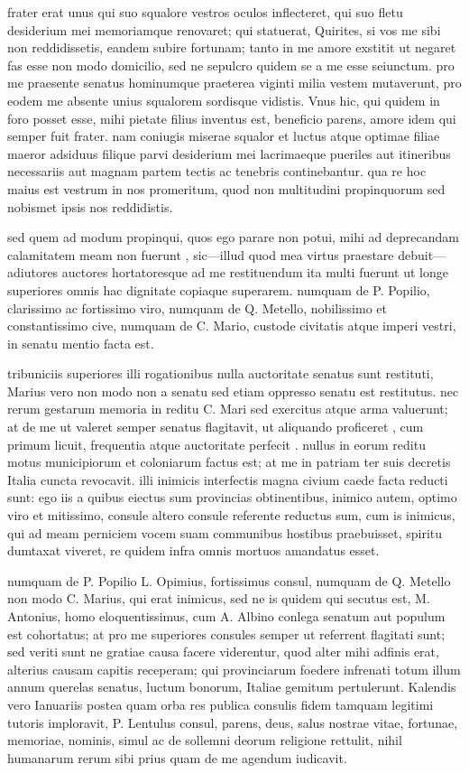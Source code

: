  frater erat unus qui suo squalore vestros oculos inflecteret, qui suo fletu desiderium mei memoriamque renovaret; qui statuerat, Quirites, si vos me sibi non reddidissetis, eandem subire fortunam; tanto in me amore exstitit ut negaret fas esse non modo domicilio, sed ne sepulcro quidem se a me esse seiunctum. pro me praesente senatus hominumque praeterea viginti milia vestem mutaverunt, pro eodem me absente unius squalorem sordisque vidistis. Vnus hic, qui quidem in foro posset esse, mihi pietate filius inventus est, beneficio parens, amore idem qui semper fuit frater. nam coniugis miserae squalor et luctus atque optimae filiae maeror adsiduus filique parvi desiderium mei lacrimaeque pueriles aut itineribus necessariis aut magnam partem tectis ac tenebris continebantur. qua re hoc maius est vestrum in nos promeritum, quod non multitudini propinquorum sed nobismet ipsis nos reddidistis.

 sed quem ad modum propinqui, quos ego parare non potui, mihi ad deprecandam calamitatem meam non fuerunt , sic—illud quod mea virtus praestare debuit—adiutores auctores hortatoresque ad me restituendum ita multi fuerunt ut longe superiores omnis hac dignitate copiaque superarem. numquam de P. Popilio, clarissimo ac fortissimo viro, numquam de Q. Metello, nobilissimo et constantissimo cive, numquam de C. Mario, custode civitatis atque imperi vestri, in senatu mentio facta est.

 tribuniciis superiores illi rogationibus nulla auctoritate senatus sunt restituti, Marius vero non modo non a senatu sed etiam oppresso senatu est restitutus. nec rerum gestarum memoria in reditu C. Mari sed exercitus atque arma valuerunt; at de me ut valeret semper senatus flagitavit, ut aliquando proficeret , cum primum licuit, frequentia atque auctoritate perfecit . nullus in eorum reditu motus municipiorum et coloniarum factus est; at me in patriam ter suis decretis Italia cuncta revocavit. illi inimicis interfectis magna civium caede facta reducti sunt: ego iis a quibus eiectus sum provincias obtinentibus, inimico autem, optimo viro et mitissimo, consule altero consule referente reductus sum, cum is inimicus, qui ad meam perniciem vocem suam communibus hostibus praebuisset, spiritu dumtaxat viveret, re quidem infra omnis mortuos amandatus esset.

 numquam de P. Popilio L. Opimius, fortissimus consul, numquam de Q. Metello non modo C. Marius, qui erat inimicus, sed ne is quidem qui secutus est, M. Antonius, homo eloquentissimus, cum A. Albino conlega senatum aut populum est cohortatus; at pro me superiores consules semper ut referrent flagitati sunt; sed veriti sunt ne gratiae causa facere viderentur, quod alter mihi adfinis erat, alterius causam capitis receperam; qui provinciarum foedere infrenati totum illum annum querelas senatus, luctum bonorum, Italiae gemitum pertulerunt. Kalendis vero Ianuariis postea quam orba res publica consulis fidem tamquam legitimi tutoris imploravit, P. Lentulus consul, parens, deus, salus nostrae vitae, fortunae, memoriae, nominis, simul ac de sollemni deorum religione rettulit, nihil humanarum rerum sibi prius quam de me agendum iudicavit.

